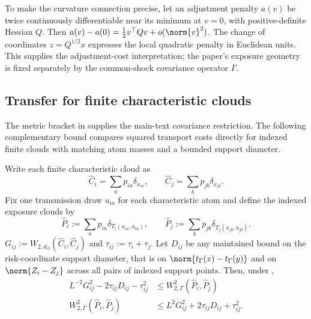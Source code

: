 To make the curvature connection precise, let an adjustment penalty $a(v)$
be twice continuously differentiable near its minimum at $v=0$, with
positive-definite Hessian $Q$.
Then $a(v)-a(0)=\tfrac12 v^\top Qv+o(\norm{v}^2)$.
The change of coordinates $z=Q^{1/2}x$ expresses the local quadratic
penalty in Euclidean units.
This supplies the adjustment-cost interpretation; the paper's exposure
geometry is fixed separately by the common-shock covariance operator $\Gamma$.

\subsection{Transfer for finite characteristic clouds}

The metric bracket in  supplies the main-text
covariance restriction.
The following complementary bound compares squared transport costs directly
for indexed finite clouds with matching atom masses and a bounded support diameter.

\begin{proposition}\label{prop:random-w2-transfer}
  Write each finite characteristic cloud as
  \[
    \widehat C_i=\sum_a p_{ia}\delta_{x_{ia}},
    \qquad
    \widehat C_j=\sum_b p_{jb}\delta_{x_{jb}}.
  \]
  Fix one transmission draw $u_{ia}$ for each characteristic atom and define
  the indexed exposure clouds by
  \[
    \widehat P_i:=\sum_a p_{ia}\delta_{T_i(x_{ia},u_{ia})},
    \qquad
    \widehat P_j:=\sum_b p_{jb}\delta_{T_j(x_{jb},u_{jb})}.
  \]
  $G_{ij}:=W_{2,d_\Omega}(\widehat C_i,\widehat C_j)$ and
  $\tau_{ij}:=\tau_i+\tau_j$. Let $D_{ij}$ be any maintained bound on the
  risk-coordinate support diameter, that is on
  $\norm{t_\Gamma(x)-t_\Gamma(y)}$ and on $\norm{Z_i-Z_j}$ across all pairs of
  indexed support points. Then, under ,
  \begin{align}
    L^{-2}G_{ij}^{2}-2\tau_{ij}D_{ij}-\tau_{ij}^{2}
    &\le W_{2,\Gamma}^{2}(\widehat P_i,\widehat P_j)
    \label{eq:random-w2-lower-transfer}\\
    W_{2,\Gamma}^{2}(\widehat P_i,\widehat P_j)
    &\le L^{2}G_{ij}^{2}+2\tau_{ij}D_{ij}+\tau_{ij}^{2}.
    \label{eq:random-w2-upper-transfer}
  \end{align}
\end{proposition}

